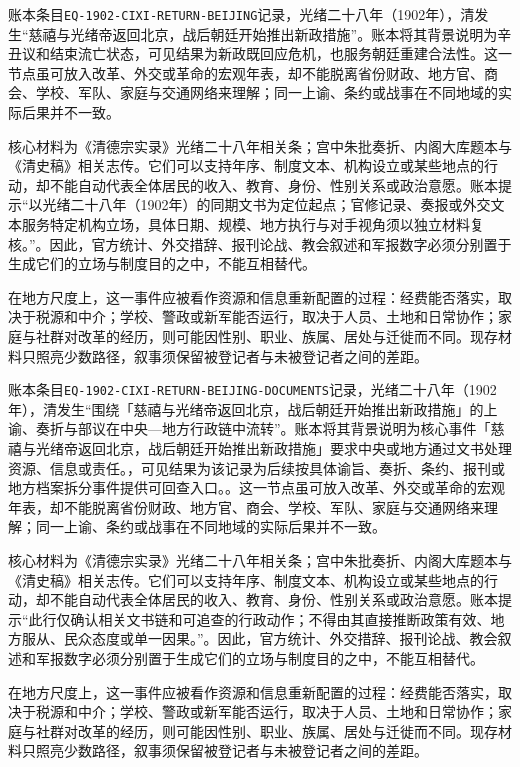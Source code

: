 账本条目\texttt{EQ-1902-CIXI-RETURN-BEIJING}记录，光绪二十八年（1902年），清发生“慈禧与光绪帝返回北京，战后朝廷开始推出新政措施”。账本将其背景说明为辛丑议和结束流亡状态，可见结果为新政既回应危机，也服务朝廷重建合法性。这一节点虽可放入改革、外交或革命的宏观年表，却不能脱离省份财政、地方官、商会、学校、军队、家庭与交通网络来理解；同一上谕、条约或战事在不同地域的实际后果并不一致。

核心材料为《清德宗实录》光绪二十八年相关条；宫中朱批奏折、内阁大库题本与《清史稿》相关志传。它们可以支持年序、制度文本、机构设立或某些地点的行动，却不能自动代表全体居民的收入、教育、身份、性别关系或政治意愿。账本提示“以光绪二十八年（1902年）的同期文书为定位起点；官修记录、奏报或外交文本服务特定机构立场，具体日期、规模、地方执行与对手视角须以独立材料复核。”。因此，官方统计、外交措辞、报刊论战、教会叙述和军报数字必须分别置于生成它们的立场与制度目的之中，不能互相替代。

在地方尺度上，这一事件应被看作资源和信息重新配置的过程：经费能否落实，取决于税源和中介；学校、警政或新军能否运行，取决于人员、土地和日常协作；家庭与社群对改革的经历，则可能因性别、职业、族属、居处与迁徙而不同。现存材料只照亮少数路径，叙事须保留被登记者与未被登记者之间的差距。

账本条目\texttt{EQ-1902-CIXI-RETURN-BEIJING-DOCUMENTS}记录，光绪二十八年（1902年），清发生“围绕「慈禧与光绪帝返回北京，战后朝廷开始推出新政措施」的上谕、奏折与部议在中央—地方行政链中流转”。账本将其背景说明为核心事件「慈禧与光绪帝返回北京，战后朝廷开始推出新政措施」要求中央或地方通过文书处理资源、信息或责任。，可见结果为该记录为后续按具体谕旨、奏折、条约、报刊或地方档案拆分事件提供可回查入口。。这一节点虽可放入改革、外交或革命的宏观年表，却不能脱离省份财政、地方官、商会、学校、军队、家庭与交通网络来理解；同一上谕、条约或战事在不同地域的实际后果并不一致。

核心材料为《清德宗实录》光绪二十八年相关条；宫中朱批奏折、内阁大库题本与《清史稿》相关志传。它们可以支持年序、制度文本、机构设立或某些地点的行动，却不能自动代表全体居民的收入、教育、身份、性别关系或政治意愿。账本提示“此行仅确认相关文书链和可追查的行政动作；不得由其直接推断政策有效、地方服从、民众态度或单一因果。”。因此，官方统计、外交措辞、报刊论战、教会叙述和军报数字必须分别置于生成它们的立场与制度目的之中，不能互相替代。

在地方尺度上，这一事件应被看作资源和信息重新配置的过程：经费能否落实，取决于税源和中介；学校、警政或新军能否运行，取决于人员、土地和日常协作；家庭与社群对改革的经历，则可能因性别、职业、族属、居处与迁徙而不同。现存材料只照亮少数路径，叙事须保留被登记者与未被登记者之间的差距。

